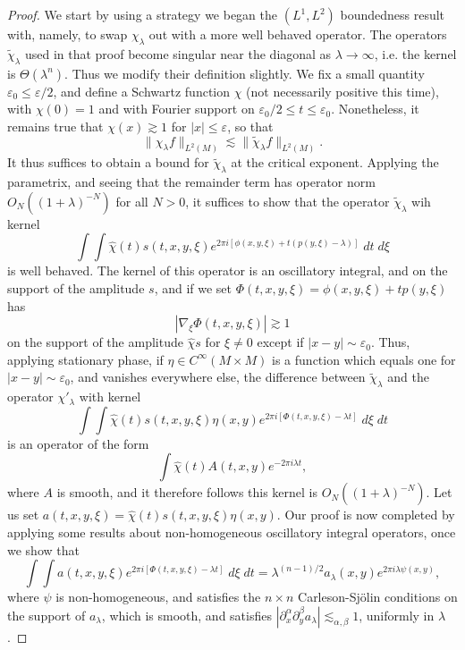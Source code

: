 \begin{proof}
    We start by using a strategy we began the $(L^1,L^2)$ boundedness result with, namely, to swap $\chi_\lambda$ out with a more well behaved operator. The operators $\tilde{\chi}_\lambda$ used in that proof become singular near the diagonal as $\lambda \to \infty$, i.e. the kernel is $\Theta(\lambda^n)$. Thus we modify their definition slightly. We fix a small quantity $\varepsilon_0 \leq \varepsilon/2$, and define a Schwartz function $\chi$ (not necessarily positive this time), with $\chi(0) = 1$ and with Fourier support on $\varepsilon_0 / 2 \leq t \leq \varepsilon_0$. Nonetheless, it remains true that $\chi(x) \gtrsim 1$ for $|x| \leq \varepsilon$, so that
    \[ \| \chi_\lambda f \|_{L^2(M)} \lesssim \| \tilde{\chi}_\lambda f \|_{L^2(M)}. \]
    It thus suffices to obtain a bound for $\tilde{\chi}_\lambda$ at the critical exponent. Applying the parametrix, and seeing that the remainder term has operator norm $O_N((1 + \lambda)^{-N})$ for all $N > 0$, it suffices to show that the operator $\tilde{\chi}_\lambda$ wih kernel
    \[ \int \int \widehat{\chi}(t) s(t,x,y,\xi) e^{2 \pi i [\phi(x,y,\xi) + t(p(y,\xi) - \lambda)]}\; dt\; d\xi \]
    is well behaved. The kernel of this operator is an oscillatory integral, and on the support of the amplitude $s$, and if we set $\Phi(t,x,y,\xi) = \phi(x,y,\xi) + t p(y,\xi)$ has
    \[ |\nabla_\xi \Phi(t,x,y,\xi)| \gtrsim 1 \]
    on the support of the amplitude $\widehat{\chi} s$ for $\xi \neq 0$ except if $|x - y| \sim \varepsilon_0$. Thus, applying stationary phase, if $\eta \in C^\infty(M \times M)$ is a function which equals one for $|x - y| \sim \varepsilon_0$, and vanishes everywhere else, the difference between $\tilde{\chi}_\lambda$ and the operator $\chi'_\lambda$ with kernel
    \[ \int \int \widehat{\chi}(t) s(t,x,y,\xi) \eta(x,y) e^{2 \pi i [\Phi(t,x,y,\xi) - \lambda t]}\; d\xi\; dt \]
    is an operator of the form
    \[ \int \widehat{\chi}(t) A(t,x,y) e^{- 2 \pi i \lambda t}, \]
    where $A$ is smooth, and it therefore follows this kernel is $O_N((1 + \lambda)^{-N})$. Let us set $a(t,x,y,\xi) = \widehat{\chi}(t) s(t,x,y,\xi) \eta(x,y)$. Our proof is now completed by applying some results about non-homogeneous oscillatory integral operators, once we show that 
    \[ \int \int a(t,x,y,\xi) e^{2 \pi i [\Phi(t,x,y,\xi) - \lambda t]}\; d\xi\; dt = \lambda^{(n-1)/2} a_\lambda(x,y) e^{2 \pi i \lambda \psi(x,y)}, \]
    where $\psi$ is non-homogeneous, and satisfies the $n \times n$ Carleson-Sj\"{o}lin conditions on the support of $a_\lambda$, which is smooth, and satisfies $|\partial_x^\alpha \partial_y^\beta a_\lambda| \lesssim_{\alpha,\beta} 1$, uniformly in $\lambda$.
\end{proof}


